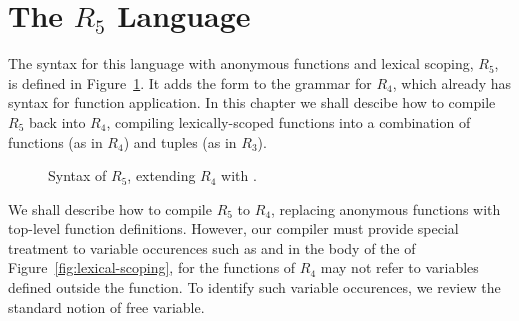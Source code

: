 \documentclass[11pt]{book}
\newcommand{\gray}[1]{{\color{lightgray} #1}}
\begin{document}
\section{The $R_5$ Language}

The syntax for this language with anonymous functions and lexical
scoping, $R_5$, is defined in Figure~\ref{fig:r5-syntax}. It adds the
 form to the grammar for $R_4$, which already has syntax
for function application.  In this chapter we shall descibe how to
compile $R_5$ back into $R_4$, compiling lexically-scoped functions
into a combination of functions (as in $R_4$) and tuples (as in
$R_3$).

\begin{figure}[tp]
\centering
\fbox{
\begin{minipage}{0.96\textwidth}
\[
\begin{array}{lcl}
  \Type &::=& \gray{\key{Integer} \mid \key{Boolean}
     \mid (\key{Vector}\;\Type^{+}) \mid \key{Void}
     \mid (\Type^{*} \; \key{->}\; \Type)} \\
  \Exp &::=& \gray{\Int \mid (\key{read}) \mid (\key{-}\;\Exp)
     \mid (\key{+} \; \Exp\;\Exp)}  \\
    &\mid&  \gray{\Var \mid \LET{\Var}{\Exp}{\Exp}
     \mid \key{\#t} \mid \key{\#f} \mid
           (\key{and}\;\Exp\;\Exp) \mid (\key{not}\;\Exp)} \\
    &\mid& \gray{(\key{eq?}\;\Exp\;\Exp) \mid \IF{\Exp}{\Exp}{\Exp}} \\
    &\mid& \gray{(\key{vector}\;\Exp^{+}) \mid
          (\key{vector-ref}\;\Exp\;\Int)} \\
    &\mid& \gray{(\key{vector-set!}\;\Exp\;\Int\;\Exp)\mid (\key{void})} \\
    &\mid& \gray{(\Exp \; \Exp^{*})} \\
    &\mid& (\key{lambda:}\; ([\Var \key{:} \Type]^{*}) \key{:} \Type \; \Exp) \\
  \Def &::=& \gray{(\key{define}\; (\Var \; [\Var \key{:} \Type]^{*}) \key{:} \Type \; \Exp)} \\
  R_5 &::=& \gray{(\key{program} \; \Def^{*} \; \Exp)}
\end{array}
\]
\end{minipage}
}
\caption{Syntax of $R_5$, extending $R_4$ with .}
\label{fig:r5-syntax}
\end{figure}

We shall describe how to compile $R_5$ to $R_4$, replacing anonymous
functions with top-level function definitions.  However, our compiler
must provide special treatment to variable occurences such as 
and  in the body of the  of
Figure~\ref{fig:lexical-scoping}, for the functions of $R_4$ may not
refer to variables defined outside the function. To identify such
variable occurences, we review the standard notion of free variable.
\end{document}
